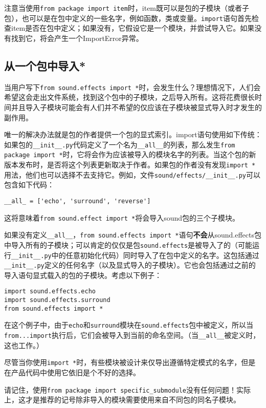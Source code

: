 \documentclass[../modules.tex]{subfiles}
\begin{document}
注意当使用\lstinline{from package import item}时，item既可以是包的子模块（或者子包），也可以是在包中定义的一些名字，例如函数，类或变量。\lstinline{import}语句首先检查item是否在包中定义；如果没有，它假设它是一个模块，并尝试导入它。如果没有找到它，将会产生一个ImportError异常。

\subsection{从一个包中导入*}

当用户写下\lstinline{from sound.effects import *}时，会发生什么？理想情况下，人们会希望这会走出文件系统，找到这个包中的子模块，之后导入所有。这将花费很长时间并且导入子模块可能会有人们并不希望的仅应该在子模块被显式导入时才发生的副作用。

唯一的解决办法就是包的作者提供一个包的显式索引。import语句使用如下传统：如果包的\lstinline{__init__.py}代码定义了一个名为\lstinline{__all__}的列表，那么发生\lstinline{from package import *}时，它将会作为应该被导入的模块名字的列表。当这个包的新版本发布时，是否将这个列表更新取决于作者。如果包的作者没有发现\lstinline{import *}用法，他们也可以选择不去支持它。例如，文件\lstinline{sound/effects/__init__.py}可以包含如下代码：
\begin{lstlisting}
__all_ = ['echo', 'surround', 'reverse']
\end{lstlisting}
这将意味着\lstinline{from sound.effect import *}将会导入sound包的三个子模块。

如果没有定义\lstinline{__all__}，\lstinline{from sound.effects import *}语句\textbf{不会}从{sound.effects}包中导入所有的子模块；可以肯定的仅仅是包\lstinline{sound.effects}是被导入了的（可能运行\lstinline{__init__.py}中的任意初始化代码）同时导入了在包中定义的名字。这包括通过\lstinline{__init__.py}定义的任何名字（以及显式导入的子模块）。它也会包括通过之前的导入语句显式载入的包的子模块。考虑以下例子：
\begin{lstlisting}
import sound.effects.echo
import sound.effects.surround
from sound.effects import *
\end{lstlisting}
在这个例子中，由于\lstinline{echo}和\lstinline{surround}模块在\lstinline{sound.effects}包中被定义，所以当\lstinline{from...import}执行后，它们会被导入到当前的命名空间。（当\lstinline{__all__}被定义时，这也工作。）

尽管当你使用\lstinline{import *}时，有些模块被设计来仅导出遵循特定模式的名字，但是在产品代码中使用它依旧是个不好的选择。

请记住，使用\lstinline{from package import specific_submodule}没有任何问题！实际上，这才是推荐的记号除非导入的模块需要使用来自不同包的同名子模块。
\end{document}
